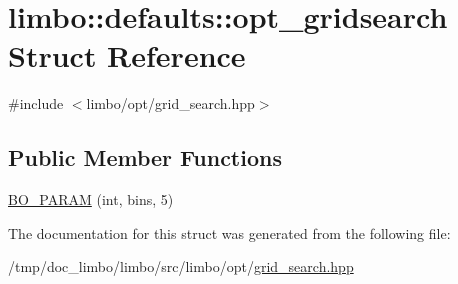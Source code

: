 \hypertarget{structlimbo_1_1defaults_1_1opt__gridsearch}{}\section{limbo\+:\+:defaults\+:\+:opt\+\_\+gridsearch Struct Reference}
\label{structlimbo_1_1defaults_1_1opt__gridsearch}


{\ttfamily \#include $<$limbo/opt/grid\+\_\+search.\+hpp$>$}

\subsection*{Public Member Functions}
\begin{DoxyCompactItemize}
\item 
\hyperlink{group__opt__defaults_ga0ce56e9b25771d8a1b381b6ec132b8fe}{B\+O\+\_\+\+P\+A\+R\+AM} (int, bins, 5)
\end{DoxyCompactItemize}


The documentation for this struct was generated from the following file\+:\begin{DoxyCompactItemize}
\item 
/tmp/doc\+\_\+limbo/limbo/src/limbo/opt/\hyperlink{grid__search_8hpp}{grid\+\_\+search.\+hpp}\end{DoxyCompactItemize}
